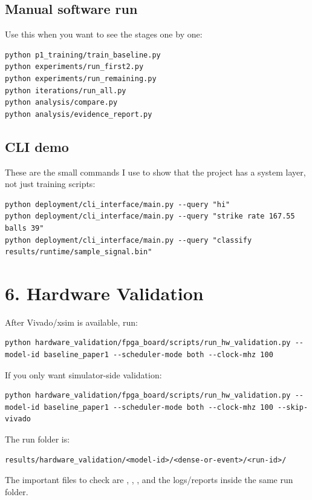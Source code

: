 \documentclass[11pt]{article}
\begin{document}
\subsection{Manual software run}
Use this when you want to see the stages one by one:
\begin{lstlisting}[style=cmd]
python p1_training/train_baseline.py
python experiments/run_first2.py
python experiments/run_remaining.py
python iterations/run_all.py
python analysis/compare.py
python analysis/evidence_report.py
\end{lstlisting}

\subsection{CLI demo}
These are the small commands I use to show that the project has a system layer,
not just training scripts:
\begin{lstlisting}[style=cmd]
python deployment/cli_interface/main.py --query "hi"
python deployment/cli_interface/main.py --query "strike rate 167.55 balls 39"
python deployment/cli_interface/main.py --query "classify results/runtime/sample_signal.bin"
\end{lstlisting}

\section{6. Hardware Validation}
After Vivado/xsim is available, run:
\begin{lstlisting}[style=cmd]
python hardware_validation/fpga_board/scripts/run_hw_validation.py --model-id baseline_paper1 --scheduler-mode both --clock-mhz 100
\end{lstlisting}

If you only want simulator-side validation:
\begin{lstlisting}[style=cmd]
python hardware_validation/fpga_board/scripts/run_hw_validation.py --model-id baseline_paper1 --scheduler-mode both --clock-mhz 100 --skip-vivado
\end{lstlisting}

The run folder is:
\begin{lstlisting}[style=cmd]
results/hardware_validation/<model-id>/<dense-or-event>/<run-id>/
\end{lstlisting}

The important files to check are ,
, , and the logs/reports
inside the same run folder.
\end{document}
